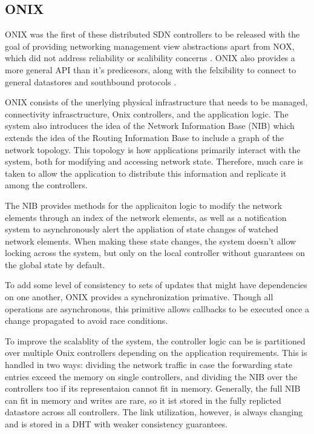 \documentclass[letterpaper,twocolumn,10pt]{article}
\begin{document}
\subsection{ONIX}

ONIX was the first of these distributed SDN controllers to be released with the goal of providing networking management view abstractions apart from NOX, which did not address reliability or scalibility concerns \cite{feamster2014road}. ONIX also provides a more general API than it's predicesors, along with the felxibility to connect to general datastores and southbound protocols \cite{koponen2010onix}.

ONIX consists of the unerlying physical infrastructure that needs to be managed, connectivity infrasctructure, Onix controllers, and the application logic. The system also introduces the idea of the Network Information Base (NIB) which extends the idea of the Routing Information Base to include a graph of the network topology. This topology is how applications primarily interact with the system, both for modifying and accessing network state. Therefore, much care is taken to allow the application to distribute this information and replicate it among the controllers.

The NIB provides methods for the applicaiton logic to modify the network elements through an index of the network elements, as well as a notification system to asynchronously alert the appliation of state changes of watched network elements. When making these state changes, the system doesn't allow locking across the system, but only on the local controller without guarantees on the global state by default. 

To add some level of consistency to sets of updates that might have dependencies on one another, ONIX provides a synchronization primative. Though all operations are asynchronous, this primitive allows callbacks to be executed once a change propagated to avoid race conditions.

To improve the scalablity of the system, the controller logic can be is partitioned over multiple Onix controllers depending on the application requirements. This is handled in two ways: dividing the network traffic in case the forwarding state entries exceed the memory on single controllers, and dividing the NIB over the controllers too if its representaion cannot fit in memory. Generally, the full NIB can fit in memory and writes are rare, so it ist stored in the fully replicted datastore across all controllers. The link utilization, however, is always changing and is stored in a DHT with weaker consistency guarantees.
\end{document}
